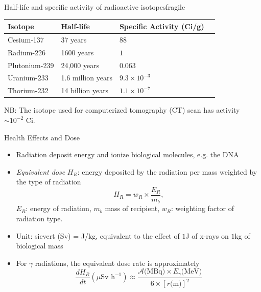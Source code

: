 \documentclass[10pt]{beamer}
\begin{document}
\begin{frame}{Half-life and specific activity of radioactive isotopes}{fragile}
  \begin{table}
  \centering
    \begin{tabular}{llll}
      \toprule
      Isotope & Half-life & Specific Activity (Ci/g) \\
      \midrule
      Cesium-137 & 37 years & $88$\\
      Radium-226 & 1600 years  & $1$\\
      Plutonium-239 & 24,000 years & $0.063$ \\
      Uranium-233 & 1.6 million years & $9.3\times 10^{-3}$\\
      Thorium-232 & 14 billion years & $1.1\times 10^{-7}$ \\
      \bottomrule
    \end{tabular}
  \end{table}
  NB: The isotope used for computerized tomography (CT) scan has activity $\sim 10^{-2}$ Ci.
\end{frame}

\begin{frame}{Health Effects and Dose}
\begin{itemize}[<+->]
\item Radiation deposit energy and ionize biological molecules, e.g. the DNA
\item \emph{Equivalent dose} $H_R$: energy deposited by the radiation per mass weighted by the type of radiation
\[H_R = w_R \times \frac{E_R}{m_b},\]
$E_R$: energy of radiation, $m_b$ mass of recipient, $w_R$: weighting factor of radiation type.
\item Unit: sievert (Sv) = J/kg, equivalent to the effect of $1$J of x-rays on $1$kg of biological mass
\item For $\gamma$ radiations, the equivalent dose rate is approximately
\[\frac{dH_R}{dt}(\mu\text{Sv h}^{-1}) \approx \frac{\mathcal{A}\text{(MBq)}\times E_{\gamma}\text{(MeV)}}{6\times [r\text{(m)}]^2}\]
\end{itemize}
\end{frame}
\end{document}
